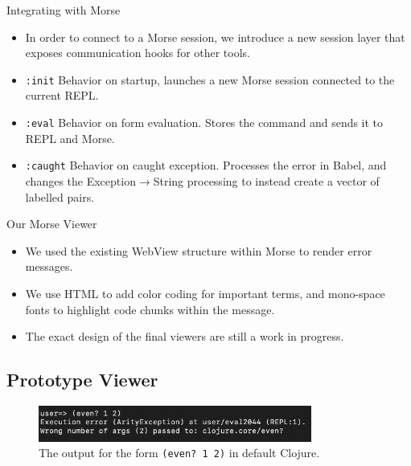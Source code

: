 \documentclass{beamer}
\begin{document}
\begin{frame}{Integrating with Morse}
  \begin{itemize}
    \item<1-> In order to connect to a Morse session, we introduce a new session layer that exposes communication hooks for other tools.
    \item<2-> \texttt{:init} Behavior on startup, launches a new Morse session connected to the current REPL.
    \item<3-> \texttt{:eval} Behavior on form evaluation. Stores the command and sends it to REPL and Morse.
    \item<4-> \texttt{:caught} Behavior on caught exception. Processes the error in Babel, and changes the Exception$\rightarrow$String processing to instead create a vector of labelled pairs.  
  \end{itemize}
\end{frame}

\begin{frame}{Our Morse Viewer}
  \begin{itemize}
  \item<1-> We used the existing WebView structure within Morse to render error messages.
  \item<2-> We use HTML to add color coding for important terms, and mono-space fonts to highlight code chunks within the message.
  \item<3-> The exact design of the final viewers are still a work in progress.
  \end{itemize}
\end{frame}

\subsection{Prototype Viewer}
\begin{frame}
  \begin{figure}
    \centering
    \includegraphics[width=0.8\textwidth]{../resources/CljDefaultEven.png}
    \caption{The output for the form \texttt{(even?~1~2)} in default Clojure. }
    \label{fig:defaultclj}
  \end{figure}
\end{frame}
\end{document}
